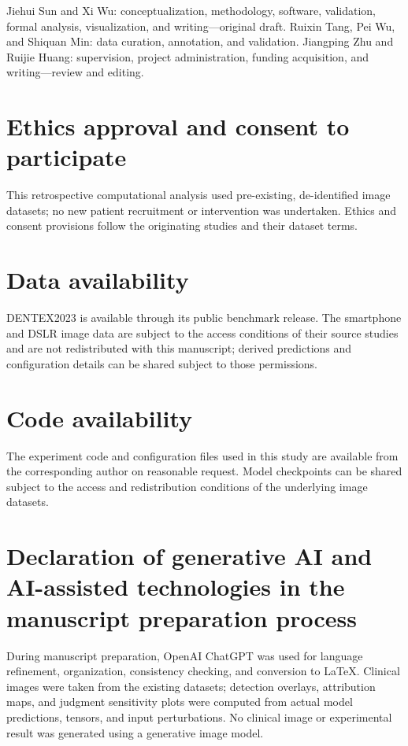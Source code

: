 \documentclass[a4paper,fleqn]{cas-dc}
\begin{document}
Jiehui Sun and Xi Wu: conceptualization, methodology, software, validation, formal analysis, visualization, and writing---original draft. Ruixin Tang, Pei Wu, and Shiquan Min: data curation, annotation, and validation. Jiangping Zhu and Ruijie Huang: supervision, project administration, funding acquisition, and writing---review and editing.

\section*{Ethics approval and consent to participate}

This retrospective computational analysis used pre-existing, de-identified image datasets; no new patient recruitment or intervention was undertaken. Ethics and consent provisions follow the originating studies and their dataset terms.

\section*{Data availability}

DENTEX2023 is available through its public benchmark release. The smartphone and DSLR image data are subject to the access conditions of their source studies and are not redistributed with this manuscript; derived predictions and configuration details can be shared subject to those permissions.

\section*{Code availability}

The experiment code and configuration files used in this study are available from the corresponding author on reasonable request. Model checkpoints can be shared subject to the access and redistribution conditions of the underlying image datasets.

\section*{Declaration of generative AI and AI-assisted technologies in the manuscript preparation process}

During manuscript preparation, OpenAI ChatGPT was used for language refinement, organization, consistency checking, and conversion to \LaTeX{}. Clinical images were taken from the existing datasets; detection overlays, attribution maps, and judgment sensitivity plots were computed from actual model predictions, tensors, and input perturbations. No clinical image or experimental result was generated using a generative image model.





\end{document}
